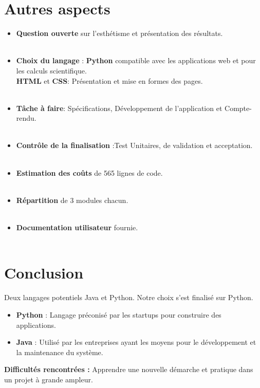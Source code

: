 	\section{Autres aspects}
	\begin{frame}
		\begin{itemize}
		\item \textbf{Question ouverte} sur l'esthétisme et présentation des résultats.\\~\\
		\pause
		\item \textbf{Choix du langage} : \textbf{Python} compatible avec les applications web et pour les calculs scientifique. \\
		\textbf{HTML} et \textbf{CSS}: Présentation et mise en formes des pages.\\~\\
		\pause
		\item \textbf{Tâche à faire}: Spécifications, Développement de l'application et Compte-rendu.\\~\\
		\pause
		\item \textbf{Contrôle de la finalisation} :Test Unitaires, de validation et acceptation.\\~\\
		\pause
		\item \textbf{Estimation des coûts} de 565 lignes de code.\\~\\
		\pause
		\item \textbf{Répartition} de 3 modules chacun.\\~\\
		\pause
		\item \textbf{Documentation utilisateur} fournie.\\~\\
		
		
		\end{itemize}
	\end{frame}
	
	\section{Conclusion}
	\begin{frame}
		Deux langages potentiels Java et Python. Notre choix s'est finalisé sur Python.
		\begin{itemize}
		\pause
		\item \textbf{Python} : Langage préconisé par les startups pour construire des applications. 
		\pause
		\item \textbf{Java} : Utilisé par les entreprises ayant les moyens pour le développement et la maintenance du système.
		\end{itemize}
		\pause
		\textbf{Difficultés rencontrées :}  Apprendre une nouvelle démarche et pratique dans un projet à grande ampleur.\\
		
		
	\end{frame}
	


